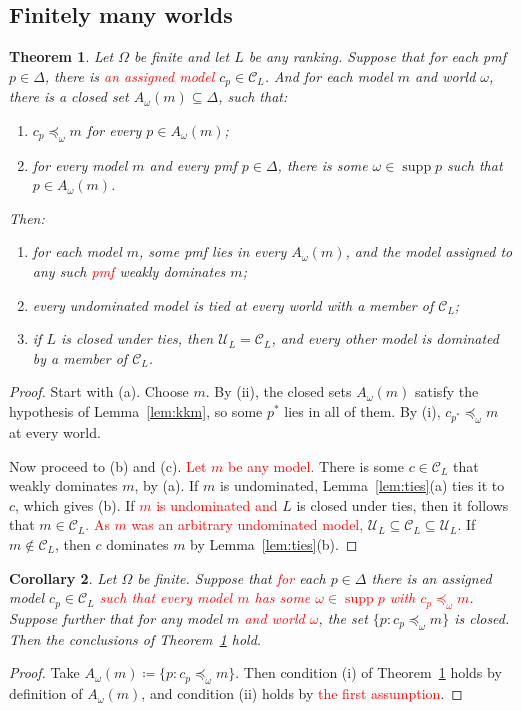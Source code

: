 \documentclass[11pt]{article}
\newtheorem{theorem}{Theorem}[section]
\newtheorem{corollary}[theorem]{Corollary}
\theoremstyle{definition}
\newcommand{\C}{\mathcal C}
\newcommand{\U}{\mathcal U}
\newcommand{\supp}{\operatorname{supp}}
\newcommand{\new}[1]{\textcolor{red}{#1}}
\begin{document}
\subsection{Finitely many worlds}
\begin{theorem}\label{thm:finite}
Let $\Omega$ be finite and let $L$ be any ranking. Suppose that for each pmf $p\in\Delta$, there is \new{an assigned model} $c_p\in\C_L$. And for each model $m$ and world $\omega$, there is a closed set $A_\omega(m)\subseteq\Delta$, such that:
\begin{enumerate}[label=(\roman*)]
\item $c_p\preceq_\omega m$ for every $p\in A_\omega(m)$;
\item for every model $m$ and every pmf $p\in\Delta$, there is some $\omega\in\supp p$ such that $p\in A_\omega(m)$.
\end{enumerate}
Then:
\begin{enumerate}[label=(\alph*)]
\item for each model $m$, some pmf lies in every $A_\omega(m)$, and the model assigned to any such \new{pmf} weakly dominates $m$;
\item every undominated model is tied at every world with a member of $\C_L$;
\item if $L$ is closed under ties, then $\U_L=\C_L$, and every other model is dominated by a member of $\C_L$.
\end{enumerate}
\end{theorem}
\begin{proof}
Start with (a). Choose $m$. By (ii), the closed sets $A_\omega(m)$ satisfy the hypothesis of Lemma~\ref{lem:kkm}, so some $p^*$ lies in all of them. By (i), $c_{p^*}\preceq_\omega m$ at every world. 

Now proceed to (b) and (c). \new{Let $m$ be any model.} There is some $c\in\C_L$ that weakly dominates $m$, by (a). If $m$ is undominated, Lemma~\ref{lem:ties}(a) ties it to $c$, which gives (b). If \new{$m$ is undominated and} $L$ is closed under ties, then it follows that $m\in\C_L$\new{. As $m$ was an arbitrary undominated model,} $\U_L\subseteq\C_L\subseteq\U_L$. If $m\notin\C_L$, then $c$ dominates $m$ by Lemma~\ref{lem:ties}(b).
\end{proof}

\begin{corollary}\label{cor:closed-choice}
Let $\Omega$ be finite. Suppose that \new{for} each $p\in\Delta$ there is an assigned model $c_p\in\C_L$ \new{such that every model $m$ has some $\omega\in\supp p$ with $c_p\preceq_\omega m$}. Suppose further that for any model $m$ \new{and world $\omega$}, the set $\{p:c_p\preceq_\omega m\}$ is closed. Then the conclusions of Theorem~\ref{thm:finite} hold.
\end{corollary}
\begin{proof}
Take $A_\omega(m)\coloneqq\{p:c_p\preceq_\omega m\}$. Then condition (i) of Theorem~\ref{thm:finite} holds by definition of $A_\omega(m)$, and condition (ii) holds by \new{the first assumption}.
\end{proof}
\end{document}
